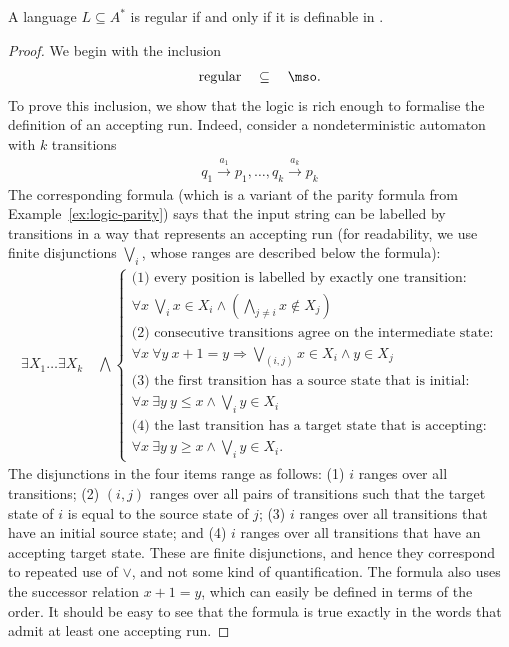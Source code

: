 \begin{theorem}
    \label{thm:mso-logic-languages}
    A language $L \subseteq A^*$ is regular if and only if it is definable in \mso.
\end{theorem}
\begin{proof}
    We begin with the inclusion 
    \begin{align*}
    \text{regular} \quad \subseteq \quad \text{\mso.}
    \end{align*}
    To prove this inclusion, we show that the logic \mso is rich enough to formalise  the definition of an accepting run. Indeed, consider a nondeterministic automaton with $k$ transitions
    \begin{align*}
    q_1 \xrightarrow {a_1} p_1 ,\ldots, q_k \xrightarrow {a_k} p_k
    \end{align*}
    The corresponding \mso formula (which is a variant of the parity formula from Example~\ref{ex:logic-parity}) says that the input string can be labelled by transitions in a way that represents an accepting run (for readability, we use finite disjunctions $\bigvee_i$, whose ranges are described below the formula): 
    \begin{align*}
        \exists X_1 \ldots \exists X_k 
        \quad \bigwedge
        \begin{cases}
            \text{(1) every position is labelled by exactly one transition:}\\
            \forall x \ \bigvee_i x \in X_i  \land (\bigwedge_{j \neq i} x \not \in X_j)\\
            \text{(2) consecutive transitions agree on the intermediate state:}\\
            \forall x \ \forall y\  x+1 = y \Rightarrow \bigvee_{(i,j) } x \in X_i \land y \in X_j \\ 
            \text{(3) the first transition has a source state that is initial:}\\
            \forall x \ \exists y \ y \leq x \land \bigvee_{i} y \in X_i\\
            \text{(4) the last transition has a target state that is accepting:}\\
            \forall x \ \exists y \ y \geq x \land \bigvee_{i} y \in X_i.
        \end{cases}
    \end{align*}
The disjunctions in the four items range as follows: (1) $i$ ranges over all transitions; (2) $(i,j)$ ranges over all pairs of transitions   such that the target state of $i$ is equal to the source state of $j$; (3) $i$ ranges over all transitions that have an initial source state; and (4) $i$ ranges over all transitions that have an accepting target state. These are finite disjunctions, and hence they correspond to repeated use of $\lor$, and not some kind of quantification.  The formula also uses the successor relation $x+1 =y $, which can easily be defined in terms of the order. It should be easy to see that the formula is true exactly in the words that admit at least one accepting run.


\end{proof}
